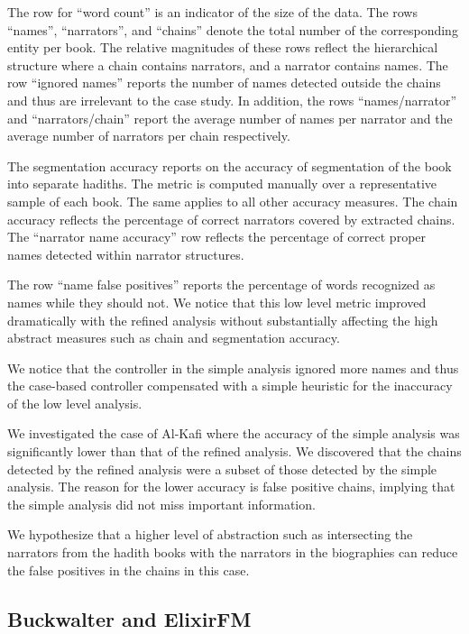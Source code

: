 \documentclass[11pt]{article}
\begin{document}
The row for ``word count'' is an indicator of the size of the data.
The %
rows ``names'', ``narrators'', and ``chains'' denote the total
number of the corresponding entity per book.
The relative magnitudes of these rows
reflect the hierarchical structure where 
a chain contains
narrators, and a narrator contains names.
The row ``ignored names'' reports the number of names detected 
outside the chains and thus are irrelevant to
the case study.
In addition, the rows ``names/narrator'' and ``narrators/chain'' 
report the average
number of names per narrator and 
the average number of narrators per chain respectively. 

The segmentation accuracy reports on the accuracy of 
segmentation of the book into separate hadiths.
The metric is computed manually over a representative sample 
of each book.
The same applies to all other accuracy measures.
The chain accuracy reflects the percentage of correct narrators 
covered by extracted chains.
The ``narrator name accuracy'' row reflects the percentage of 
correct proper names detected within
narrator structures.

The row ``name false positives'' reports the percentage of words 
recognized as names while they should not.
We notice that this low level metric improved dramatically 
with the refined analysis without substantially affecting the 
high abstract measures such as chain and segmentation
accuracy.

We notice that the controller in the simple analysis ignored 
more names and thus the case-based
controller compensated with a simple heuristic
for the inaccuracy of the low level 
analysis.

We investigated the case of Al-Kafi where the accuracy of 
the simple analysis was significantly lower than that of the 
refined analysis. 
We discovered that the chains detected by the refined analysis 
were a subset of those detected by the simple
analysis. 
The reason for the lower accuracy is false positive chains, 
implying that the simple analysis did not miss important 
information. 

We hypothesize that a higher level of abstraction such as 
intersecting the narrators from the hadith books with the narrators 
in the biographies can reduce the false positives in the chains
in this case.

\subsection{Buckwalter and ElixirFM}
\end{document}
